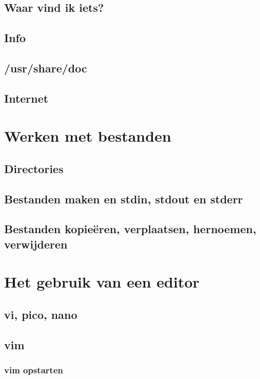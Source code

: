 \documentclass[a4paper,12pt,twoside,openright,titlepage]{book}
\begin{document}
\section{Waar vind ik iets?}

\section{Info}

\section{/usr/share/doc}

\section{Internet}


\chapter{Werken met bestanden}

\section{Directories}

\section{Bestanden maken en stdin, stdout en stderr}

\section{Bestanden kopie\"eren, verplaatsen, hernoemen, verwijderen}


\chapter{Het gebruik van een editor}

\section{vi, pico, nano}

\section{vim}

\subsection{vim opstarten}





\end{document}
